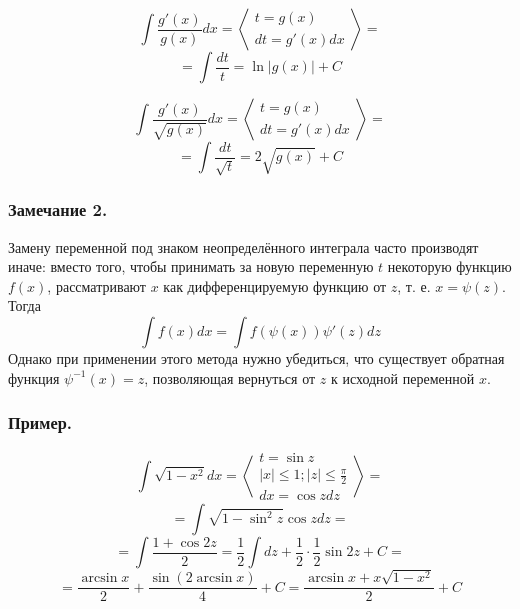 $$\int \frac{g'(x)}{g(x)} dx = 
\left<\begin{array}{c}
t=g(x) \\
dt=g'(x)dx
\end{array}\right>=$$ $$=
\int \frac{dt}{t}=\ln|g(x)|+C
$$

$$\int \frac{g'(x)}{\sqrt{g(x)}} dx = 
\left<\begin{array}{c}
t=g(x) \\
dt=g'(x)dx
\end{array}\right>=$$ $$=
\int \frac{dt}{\sqrt{t}}=2\sqrt{g(x)}+C
$$

\subsubsection{Замечание 2.}
Замену переменной под знаком неопределённого интеграла часто производят иначе: вместо того, чтобы принимать за новую переменную $t$ некоторую функцию $f(x)$, рассматривают $x$ как дифференцируемую функцию от $z$, т. е. $x=\psi(z)$. Тогда
$$\int f(x)dx=\int f(\psi(x))\psi'(z)dz$$
Однако при применении этого метода нужно убедиться, что существует обратная функция $\psi^{-1}(x)=z$, позволяющая вернуться от $z$ к исходной переменной $x$.

\subsubsection{Пример.}
$$\int \sqrt{1-x^2}dx =
\left<\begin{array}{c}
t=\sin z \\
|x|\leq 1; |z|\leq \frac{\pi}{2}\\
dx=\cos z dz
\end{array}\right>=$$ $$=
\int\sqrt{1-\sin^2 z} \cos z dz=$$$$=
\int\frac{1+\cos 2z}{2}=\frac{1}{2}\int dz +\frac{1}{2}\cdot \frac{1}{2} \sin 2z +C=$$$$=
\frac{\arcsin x}{2}+\frac{\sin(2\arcsin x)}{4}+C=\frac{\arcsin x + x\sqrt{1-x^2}}{2}+C
$$
